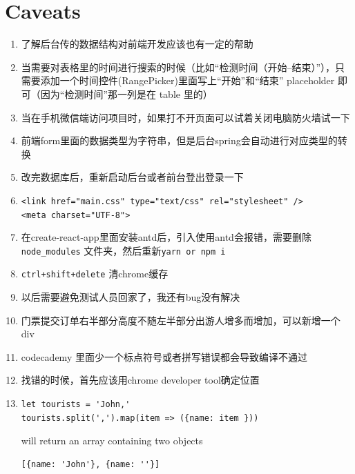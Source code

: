 \documentclass[a4paper, 12pt]{article}
\begin{document}
\section{Caveats}
\begin{enumerate}

\item 了解后台传的数据结构对前端开发应该也有一定的帮助

\item 当需要对表格里的时间进行搜索的时候（比如“检测时间（开始--结束）”），只需要添加一个时间控件(RangePicker)里面写上“开始”和“结束” placeholder 即可（因为“检测时间”那一列是在 table 里的）

\item 当在手机微信端访问项目时，如果打不开页面可以试着关闭电脑防火墙试一下

\item 前端form里面的数据类型为字符串，但是后台spring会自动进行对应类型的转换

\item 改完数据库后，重新启动后台或者前台登出登录一下

\item \verb|<link href="main.css" type="text/css" rel="stylesheet" />|\\
\verb|<meta charset="UTF-8">|

\item 在create-react-app里面安装antd后，引入使用antd会报错，需要删除\\ \verb|node_modules| 文件夹，然后重新\verb|yarn or npm i|

\item \verb|ctrl+shift+delete| 清chrome缓存

\item 以后需要避免测试人员回家了，我还有bug没有解决

\item 门票提交订单右半部分高度不随左半部分出游人增多而增加，可以新增一个div

\item codecademy 里面少一个标点符号或者拼写错误都会导致编译不通过

\item 找错的时候，首先应该用chrome developer tool确定位置

\item 
\begin{verbatim}
let tourists = 'John,'
tourists.split(',').map(item => ({name: item }))
\end{verbatim}
will return an array containing two objects
\begin{verbatim}
[{name: 'John'}, {name: ''}]
\end{verbatim}


\end{enumerate}
\end{document}
